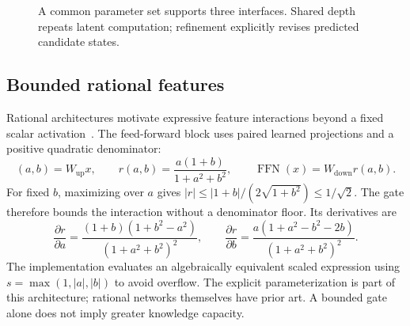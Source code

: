 \documentclass[11pt]{article}
\begin{document}
\begin{figure}[H]
\centering
{}
\caption{A common parameter set supports three interfaces. Shared depth repeats
latent computation; refinement explicitly revises predicted candidate states.}
\end{figure}

\subsection{Bounded rational features}
Rational architectures motivate expressive feature interactions beyond a fixed
scalar activation~\cite{cofr,ran}. The feed-forward block uses paired learned
projections and a positive quadratic denominator:
\begin{equation}
 (a,b)=W_{\mathrm{up}}x,\qquad
 r(a,b)=\frac{a(1+b)}{1+a^2+b^2},\qquad
 \operatorname{FFN}(x)=W_{\mathrm{down}}r(a,b).
 \label{eq:gate}
\end{equation}
For fixed $b$, maximizing over $a$ gives
$|r|\le |1+b|/(2\sqrt{1+b^2})\le1/\sqrt2$. The gate therefore bounds the
interaction without a denominator floor. Its derivatives are
\begin{equation}
 \frac{\partial r}{\partial a}=\frac{(1+b)(1+b^2-a^2)}{(1+a^2+b^2)^2},\qquad
 \frac{\partial r}{\partial b}=\frac{a(1+a^2-b^2-2b)}{(1+a^2+b^2)^2}.
\end{equation}
The implementation evaluates an algebraically equivalent scaled expression
using $s=\max(1,|a|,|b|)$ to avoid overflow. The explicit parameterization is
part of this architecture; rational networks themselves have prior art.
A bounded gate alone does not imply greater knowledge capacity.
\end{document}
